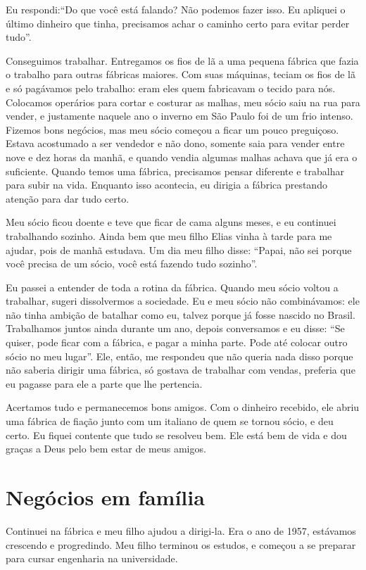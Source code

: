 Eu respondi:``Do que você está falando? Não podemos fazer isso. Eu
apliquei o último dinheiro que tinha, precisamos achar o caminho certo
para evitar perder tudo''.

Conseguimos trabalhar. Entregamos os fios de lã a uma pequena fábrica
que fazia o trabalho para outras fábricas maiores. Com suas máquinas,
teciam os fios de lã e só pagávamos pelo trabalho: eram eles quem fabricavam
o tecido para nós. Colocamos operários para cortar e costurar as malhas,
meu sócio saiu na rua para vender, e justamente naquele ano o inverno em São Paulo foi
de um frio intenso. Fizemos bons negócios, mas meu sócio
começou a ficar um pouco preguiçoso. Estava acostumado a ser vendedor
e não dono, somente saia para vender entre nove e dez horas da manhã, e
quando vendia algumas malhas achava que já era o suficiente. Quando
temos uma fábrica, precisamos pensar diferente e trabalhar para subir na
vida. Enquanto isso acontecia, eu dirigia a fábrica prestando
atenção para dar tudo certo.

Meu sócio ficou doente e teve que ficar de cama alguns meses, e eu
continuei trabalhando sozinho. Ainda bem que meu filho Elias vinha à
tarde para me ajudar, pois de manhã estudava. Um dia meu filho
disse: ``Papai, não sei porque você precisa de um sócio, você está
fazendo tudo sozinho''.

Eu passei a entender de toda a rotina da fábrica. Quando meu sócio voltou a
trabalhar, sugeri dissolvermos a sociedade. Eu e
meu sócio não combinávamos: ele não tinha ambição de batalhar como eu,
talvez porque já fosse nascido no Brasil. Trabalhamos juntos
ainda durante um ano, depois conversamos e eu disse: ``Se quiser,
pode ficar com a fábrica, e pagar a minha parte. Pode até colocar outro
sócio no meu lugar''. Ele, então, me respondeu que não queria nada disso
porque não saberia dirigir uma fábrica, só gostava de trabalhar com
vendas, preferia que eu pagasse para ele a parte que lhe pertencia.

Acertamos tudo e permanecemos bons amigos. Com o dinheiro recebido, ele abriu uma fábrica de fiação junto com um italiano de quem se tornou sócio, e deu
certo. Eu fiquei contente que tudo se resolveu bem. Ele está bem de
vida e dou graças a Deus pelo bem estar de meus amigos.

\chapter{Negócios em família}

Continuei na fábrica e meu filho ajudou a dirigi-la. Era o ano
de 1957, estávamos crescendo e progredindo. Meu filho
terminou os estudos, e começou a se preparar para cursar engenharia na universidade.

